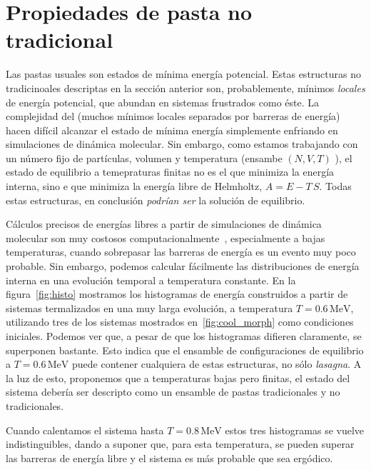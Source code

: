 \section{Propiedades de pasta no tradicional}
\label{unusual_pasta}

Las pastas usuales son estados de mínima energía potencial.
Estas estructuras no tradicinoales descriptas en la sección anterior son, probablemente, mínimos \emph{locales} de energía potencial, que abundan en sistemas frustrados como éste.
La complejidad del  (muchos mínimos locales separados por barreras de energía) hacen difícil alcanzar el estado de mínima energía simplemente enfriando en simulaciones de dinámica molecular.
Sin embargo, como estamos trabajando con un número fijo de partículas, volumen y temperatura (ensambe $(N,V,T)$
), el estado de equilibrio a temepraturas finitas no es el que minimiza la energía interna, sino e que minimiza la energía libre de Helmholtz, $A = E - T\,S$.
Todas estas estructuras, en conclusión \emph{podrían ser} la solución de equilibrio.

Cálculos precisos de energías libres a partir de simulaciones de dinámica molecular son muy costosos computacionalmente~\cite[pp. 167-200]{frenkel}, especialmente a bajas temperaturas, cuando sobrepasar las barreras de energía es un evento muy poco probable.
Sin embargo, podemos calcular fácilmente las distribuciones de energía interna en una evolución temporal a temperatura constante.
En la figura~\ref{fig:histo} mostramos los histogramas de energía construidos a partir de sistemas termalizados en una muy larga evolución, a temperatura $T=0.6\,\text{MeV}$, utilizando tres de los sistemas mostrados en~\ref{fig:cool_morph} como condiciones iniciales.
Podemos ver que, a pesar de que los histogramas difieren claramente, se superponen bastante.
Esto indica que el ensamble de configuraciones de equilibrio a $T=0.6\,\text{MeV}$ puede contener cualquiera de estas estructuras, no sólo \emph{lasagna}.
A la luz de esto, proponemos que a temperaturas bajas pero finitas, el estado del sistema debería ser descripto como un ensamble de pastas tradicionales y no tradicionales.

Cuando calentamos el sistema hasta $T=0.8\,\text{MeV}$ estos tres histogramas se vuelve indistinguibles, dando a suponer que, para esta temperatura, se pueden superar las barreras de energía libre y el sistema es más probable que sea ergódico.

